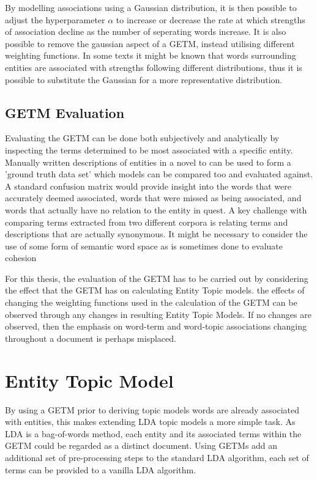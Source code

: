 \documentclass[10pt]{report}
\begin{document}
By modelling associations using a Gaussian distribution, it is then possible to adjust the hyperparameter \(\alpha\) to increase or decrease the rate at which strengths of association decline as the number of seperating words increase. It is also possible to remove the gaussian aspect of a GETM, instead utilising different weighting functions. In some texts it might be known that words surrounding entities are associated with strengths following different distributions, thus it is possible to substitute the Gaussian for a more representative distribution. 

\subsection{GETM Evaluation}
Evaluating the GETM can be done both subjectively and analytically by inspecting the terms determined to be most associated with a specific entity.  Manually written descriptions of entities in a novel to can be used to form a 'ground truth data set' which models can be compared too and evaluated against. A standard confusion matrix would provide insight into the words that were accurately deemed associated, words that were missed as being associated, and words that actually have no relation to the entity in quest. A key challenge with comparing terms extracted from two different corpora is relating terms and descriptions that are actually synonymous. It might be necessary to consider the use of some form of semantic word space as is sometimes done to evaluate cohesion

For this thesis, the evaluation of the GETM has to be carried out by considering the effect that the GETM has on calculating Entity Topic models. the effects of changing the weighting functions used in the calculation of the GETM can be observed through any changes in resulting Entity Topic Models. If no changes are observed, then the emphasis on word-term and word-topic associations changing throughout a document is perhaps misplaced. 


\section{Entity Topic Model}
By using a GETM prior to deriving topic models words are already associated with entities, this makes extending LDA topic models a more simple task. As LDA is a bag-of-words method, each entity and its associated terms within the GETM could be regarded as a distinct document. Using GETMs add an additional set of pre-processing steps to the standard LDA algorithm, each set of terms can be provided to a vanilla LDA algorithm.
\end{document}
